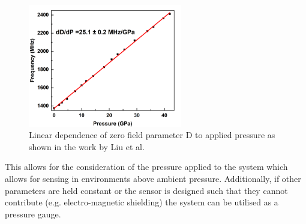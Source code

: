 \begin{figure}[H]
	\begin{center}
		\includegraphics[width=0.6\textwidth]{figures/PressureDependence.png}
	\end{center}
	\caption{Linear dependence of zero field parameter D to applied pressure as shown in the work by Liu et al.}\label{fig:pressure_d}
\end{figure}

This allows for the consideration of the pressure applied to the system which allows for sensing in environments above ambient pressure. Additionally, if other parameters are held constant or the sensor is designed such that they cannot contribute (e.g. electro-magnetic shielding) the system can be utilised as a pressure gauge. 


